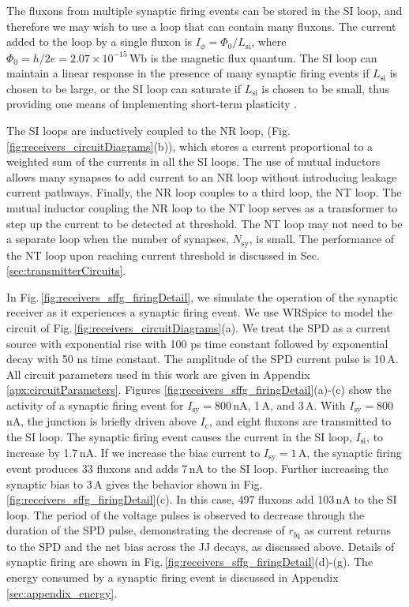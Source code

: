 \documentclass[aip,amsmath,amssymb,reprint,nofootinbib]{revtex4-1}
\begin{document}
The fluxons from multiple synaptic firing events can be stored in the SI loop, and therefore we may wish to use a loop that can contain many fluxons. The current added to the loop by a single fluxon is $I_{\phi} = \Phi_0/L_{\mathrm{si}}$, where $\Phi_{0} = h/2e = 2.07\times 10^{-15}$\,Wb is the magnetic flux quantum. The SI loop can maintain a linear response in the presence of many synaptic firing events if $L_{\mathrm{si}}$ is chosen to be large, or the SI loop can saturate if $L_{\mathrm{si}}$ is chosen to be small, thus providing one means of implementing short-term plasticity \cite{abre2004}.

The SI loops are inductively coupled to the NR loop, (Fig.\,\ref{fig:receivers_circuitDiagrams}(b)), which stores a current proportional to a weighted sum of the currents in all the SI loops. The use of mutual inductors allows many synapses to add current to an NR loop without introducing leakage current pathways. Finally, the NR loop couples to a third loop, the NT loop. The mutual inductor coupling the NR loop to the NT loop serves as a transformer to step up the current to be detected at threshold. The NT loop may not need to be a separate loop when the number of synapses, $N_{\mathrm{sy}}$, is small. The performance of the NT loop upon reaching current threshold is discussed in Sec.\,\ref{sec:transmitterCircuits}.

In Fig.\,\ref{fig:receivers_sffg_firingDetail}, we simulate the operation of the synaptic receiver as it experiences a synaptic firing event. We use WRSpice \cite{wh1991} to model the circuit of Fig.\,\ref{fig:receivers_circuitDiagrams}(a). We treat the SPD as a current source with exponential rise with 100 ps time constant followed by exponential decay with 50 ns time constant. The amplitude of the SPD current pulse is 10\,\textmu A. All circuit parameters used in this work are given in Appendix \ref{apx:circuitParameters}. Figures \ref{fig:receivers_sffg_firingDetail}(a)-(c) show the activity of a synaptic firing event for $I_{\mathrm{sy}} = 800$\,nA, 1\,\textmu A, and 3\,\textmu A. With $I_{\mathrm{sy}} = 800$\,nA, the junction is briefly driven above $I_{\mathrm{c}}$, and eight fluxons are transmitted to the SI loop. The synaptic firing event causes the current in the SI loop, $I_{\mathrm{si}}$, to increase by 1.7\,nA. If we increase the bias current to $I_{\mathrm{sy}} = 1$\,\textmu A, the synaptic firing event produces 33 fluxons and adds 7\,nA to the SI loop. Further increasing the synaptic bias to 3\,\textmu A gives the behavior shown in Fig.\,\ref{fig:receivers_sffg_firingDetail}(c). In this case, 497 fluxons add 103\,nA to the SI loop. The period of the voltage pulses is observed to decrease through the duration of the SPD pulse, demonstrating the decrease of $r_{\mathrm{fq}}$ as current returns to the SPD and the net bias across the JJ decays, as discussed above. Details of synaptic firing are shown in Fig.\,\ref{fig:receivers_sffg_firingDetail}(d)-(g). The energy consumed by a synaptic firing event is discussed in Appendix \ref{sec:appendix_energy}.
\end{document}
